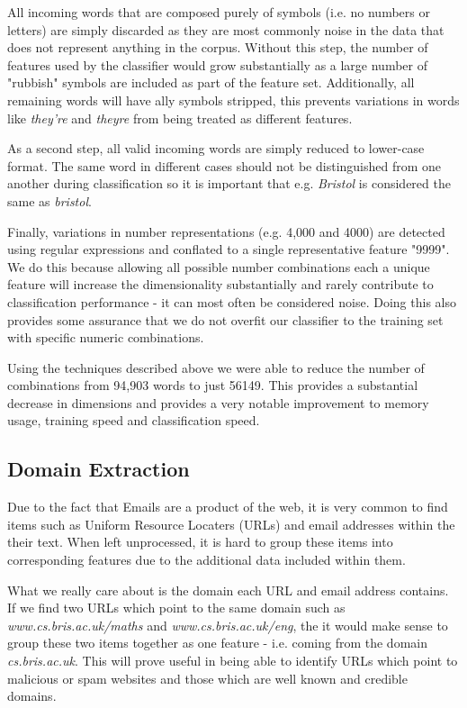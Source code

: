 All incoming words that are composed purely of symbols (i.e. no numbers or letters) are simply discarded as they are most commonly noise in the data that does not represent anything in the corpus. Without this step, the number of features used by the classifier would grow substantially as a large number of "rubbish" symbols are included as part of the feature set. Additionally, all remaining words will have ally symbols stripped, this prevents variations in words like {\it they're} and {\it theyre} from being treated as different features.

As a second step, all valid incoming words are simply reduced to lower-case format. The same word in different cases should not be distinguished from one another during classification so it is important that e.g. {\it Bristol} is considered the same as {\it bristol}.

Finally, variations in number representations (e.g. 4,000 and 4000) are detected using regular expressions and conflated to a single representative feature "9999". We do this because allowing all possible number combinations each a unique feature will increase the dimensionality substantially and rarely contribute to classification performance - it can most often be considered noise. Doing this also provides some assurance that we do not overfit our classifier to the training set with specific numeric combinations.

Using the techniques described above we were able to reduce the number of  combinations from 94,903 words to just 56149. This provides a substantial decrease in dimensions and provides a very notable improvement to memory usage, training speed and classification speed. 

\subsection{Domain Extraction}

Due to the fact that Emails are a product of the web, it is very common to find items such as Uniform Resource Locaters (URLs) and email addresses within the their text. When left unprocessed, it is hard to group these items into corresponding features due to the additional data included within them.

What we really care about is the domain each URL and email address contains. If we find two URLs which point to the same domain such as \emph{www.cs.bris.ac.uk/maths} and {\it www.cs.bris.ac.uk/eng}, the it would make sense to group these two items together as one feature - i.e. coming from the domain \emph{cs.bris.ac.uk}. This will prove useful in being able to identify URLs which point to malicious or spam websites and those which are well known and credible domains.

